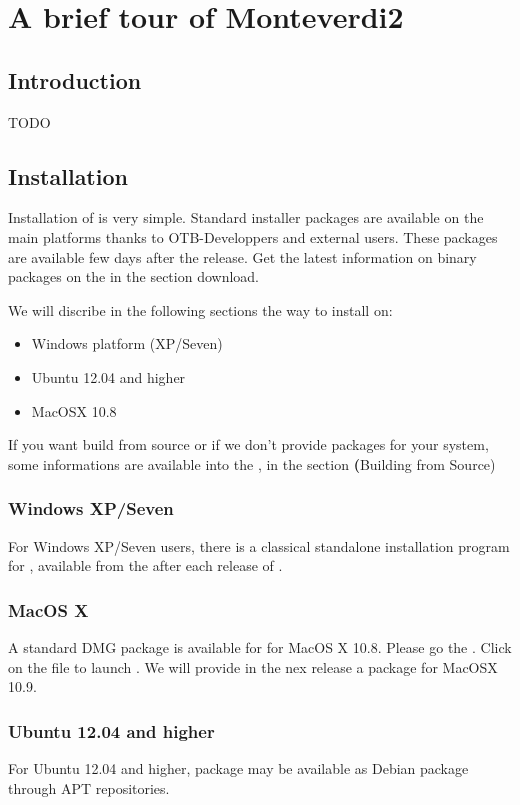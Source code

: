 \chapter{A brief tour of Monteverdi2}\label{chap:Monteverdi2} 

\section{Introduction}\label{sec:montintro}
TODO 

\section{Installation}\label{sec:montinstall} 
  
Installation of  is very simple. Standard installer packages are available on the main platforms thanks to OTB-Developpers and external users. These packages are available few days after the release. Get the latest information on binary packages on the \website in the section download.

We will discribe in the following sections the way to install  on:
\begin{itemize}
\item Windows platform (XP/Seven)
\item Ubuntu 12.04 and higher
\item MacOSX 10.8
\end{itemize}

If you want build from source or if we don't provide packages for your system, some informations are available into the \sg, in the section \textbf(Building from Source)

\subsection{Windows XP/Seven}
For Windows XP/Seven users, there is a classical standalone installation program for , available from the \download after each release of . 

\subsection{MacOS X}
A standard DMG package is available for  for MacOS X 10.8. Please go the \download.
Click on the file to launch . We will provide in the nex release a package for MacOSX 10.9.

\subsection{Ubuntu 12.04 and higher}
For Ubuntu 12.04 and higher,  package may be available as Debian package through APT repositories.

